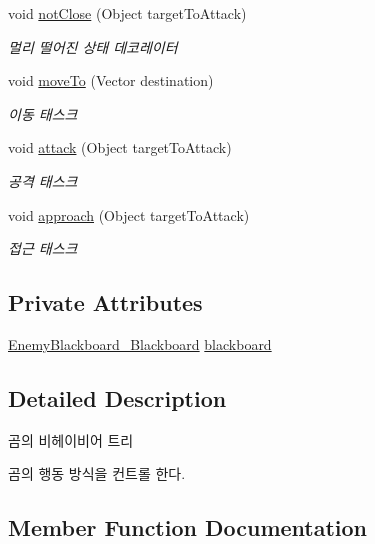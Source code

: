 \begin{DoxyCompactItemize}
void \hyperlink{class_bear_behavior_tree___behavior_tree_a4fb3030436667eba76f35eff2201b13b}{not\+Close} (Object target\+To\+Attack)
\begin{DoxyCompactList}\small\item\em 멀리 떨어진 상태 데코레이터 \end{DoxyCompactList}\item 
void \hyperlink{class_bear_behavior_tree___behavior_tree_aba205bd3c0ead482d7dff54693a7b2a2}{move\+To} (Vector destination)
\begin{DoxyCompactList}\small\item\em 이동 태스크 \end{DoxyCompactList}\item 
void \hyperlink{class_bear_behavior_tree___behavior_tree_a03d8bdee8baffed5b5f51351302744da}{attack} (Object target\+To\+Attack)
\begin{DoxyCompactList}\small\item\em 공격 태스크 \end{DoxyCompactList}\item 
void \hyperlink{class_bear_behavior_tree___behavior_tree_ae22286b24ddb389f5c147fca13aac2b4}{approach} (Object target\+To\+Attack)
\begin{DoxyCompactList}\small\item\em 접근 태스크 \end{DoxyCompactList}\end{DoxyCompactItemize}
\subsection*{Private Attributes}
\begin{DoxyCompactItemize}
\item 
\hyperlink{class_enemy_blackboard___blackboard}{Enemy\+Blackboard\+\_\+\+Blackboard} \hyperlink{class_bear_behavior_tree___behavior_tree_af65805184758188534eb2100723629d7}{blackboard}
\end{DoxyCompactItemize}


\subsection{Detailed Description}
곰의 비헤이비어 트리 

곰의 행동 방식을 컨트롤 한다. 

\subsection{Member Function Documentation}
